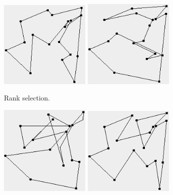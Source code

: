 \documentclass[10pt,a4paper,openbib]{article}
\begin{document}
\begin{multicols}{2}
\begin{figure}[H]
\begin{center}
    \begin{subfigure}[b]{0.23\textwidth}
        \includegraphics[width=0.48\textwidth]{images/result3/Binaryfalse0.png}
        \includegraphics[width=0.48\textwidth]{images/result3/Binaryfalse7.png}
        \caption{Rank selection.}
        \label{fig:cities18GraphBinaryfalse}
    \end{subfigure}
    \begin{subfigure}[b]{0.23\textwidth}
        \includegraphics[width=0.48\textwidth]{images/result3/Binarytrue0.png}
        \includegraphics[width=0.48\textwidth]{images/result3/Binarytrue6.png}

\end{subfigure}
\end{center}
\end{figure}
\end{multicols}
\end{document}
